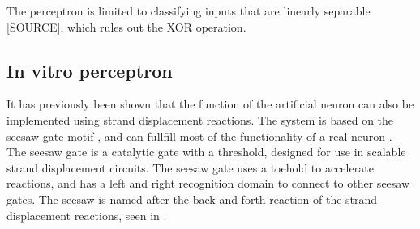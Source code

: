 The perceptron is limited to classifying inputs that are linearly separable [SOURCE], which rules out the XOR operation.



%
%

\subsection{In vitro perceptron}
It has previously been shown that the function of the artificial neuron can also be implemented using strand displacement reactions. The system is based on the seesaw gate motif \cite{Qian}, and can fullfill most of the functionality of a real neuron \cite{Qian2011}. The seesaw gate is a catalytic gate with a threshold, designed for use in scalable strand displacement circuits. The seesaw gate uses a toehold to accelerate reactions, and has a left and right recognition domain to connect to other seesaw gates. The seesaw is named after the back and forth reaction of the strand displacement reactions, seen in .

